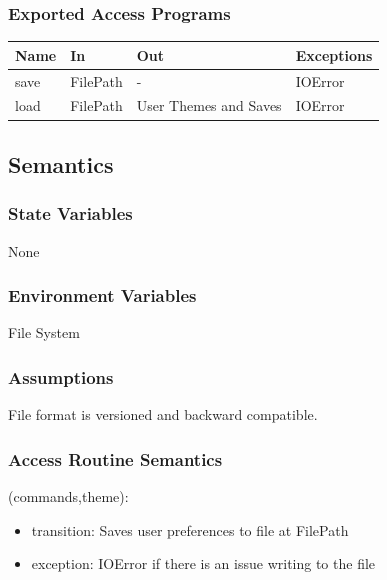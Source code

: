 \documentclass[12pt, titlepage]{article}
\begin{document}
\subsubsection{Exported Access Programs}

\begin{center}
\begin{tabular}{p{2cm} p{4cm} p{4cm} p{2cm}}
\hline
\textbf{Name} & \textbf{In} & \textbf{Out} & \textbf{Exceptions} \\
\hline
{save} & FilePath & - & IOError \\
\hline
{load} & FilePath & User Themes and Saves & IOError \\
\hline
\end{tabular}
\end{center}

\subsection{Semantics}

\subsubsection{State Variables}
None

\subsubsection{Environment Variables}
File System


\subsubsection{Assumptions}
File format is versioned and backward compatible.

\subsubsection{Access Routine Semantics}

(commands,theme):
\begin{itemize}
\item transition: Saves user preferences to file at FilePath
\item exception: IOError if there is an issue writing to the file
\end{itemize}
\end{document}
